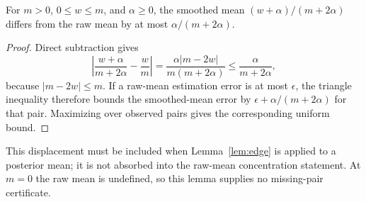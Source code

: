 \begin{lemma}\label{lem:pseudocount-bias}
For $m>0$, $0\le w\le m$, and $\alpha\ge0$, the smoothed mean $(w+\alpha)/(m+2\alpha)$ differs from the raw mean by at most $\alpha/(m+2\alpha)$.
\end{lemma}
\begin{proof}
Direct subtraction gives
\[
\left|\frac{w+\alpha}{m+2\alpha}-\frac wm\right|
=\frac{\alpha|m-2w|}{m(m+2\alpha)}
\le\frac{\alpha}{m+2\alpha},
\]
because $|m-2w|\le m$. If a raw-mean estimation error is at most $\epsilon$, the triangle inequality therefore bounds the smoothed-mean error by $\epsilon+\alpha/(m+2\alpha)$ for that pair. Maximizing over observed pairs gives the corresponding uniform bound.
\end{proof}
This displacement must be included when Lemma~\ref{lem:edge} is applied to a posterior mean; it is not absorbed into the raw-mean concentration statement. At $m=0$ the raw mean is undefined, so this lemma supplies no missing-pair certificate.

